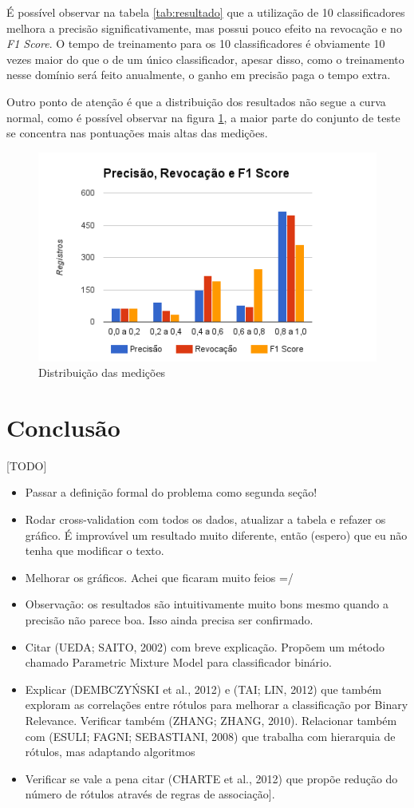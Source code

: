 \documentclass[runningheads,a4paper]{llncs}
\begin{document}
É possível observar na tabela \ref{tab:resultado} que a utilização de 10 classificadores melhora a precisão significativamente, mas possui pouco efeito na revocação e no \textit{F1 Score}. O tempo de treinamento para os 10 classificadores é obviamente 10 vezes maior do que o de um único classificador, apesar disso, como o treinamento nesse domínio será feito anualmente, o ganho em precisão paga o tempo extra.

Outro ponto de atenção é que a distribuição dos resultados não segue a curva normal, como é possível observar na figura \ref{fig:medicoes}, a maior parte do conjunto de teste se concentra nas pontuações mais altas das medições.

\begin{figure}
	\includegraphics[scale=0.7]{medicoes}
	\caption{Distribuição das medições}
	\label{fig:medicoes}
\end{figure}


\section{Conclusão} \label{sec:conclusao}

[TODO]
\begin{itemize}
	\item Passar a definição formal do problema como segunda seção!
	\item Rodar cross-validation com todos os dados, atualizar a tabela e refazer os gráfico. É improvável um resultado muito diferente, então (espero) que eu não tenha que modificar o texto.
	\item Melhorar os gráficos. Achei que ficaram muito feios =/
	\item Observação: os resultados são intuitivamente muito bons mesmo quando a precisão não parece boa. Isso ainda precisa ser confirmado.
	\item Citar (UEDA; SAITO, 2002) com breve explicação. Propõem um método chamado Parametric Mixture Model para classificador binário.
	\item Explicar (DEMBCZYŃSKI et al., 2012) e (TAI; LIN, 2012) que também exploram as correlações entre rótulos para melhorar a classificação por Binary Relevance. Verificar também (ZHANG; ZHANG, 2010). Relacionar também com (ESULI; FAGNI; SEBASTIANI, 2008) que trabalha com hierarquia de rótulos, mas adaptando algoritmos
	\item Verificar se vale a pena citar (CHARTE et al., 2012) que propõe redução do número de rótulos através de regras de associação].
\end{itemize}



\end{document}
